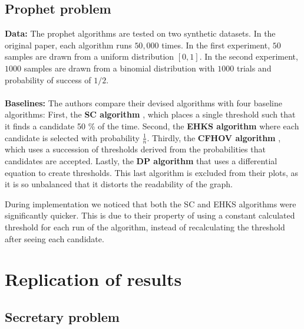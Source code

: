 \subsection{Prophet problem}
\textbf{Data:}
The prophet algorithms are tested on two synthetic datasets. In the original paper, each algorithm runs $50,000$ times. In the first experiment, $50$ samples are drawn from a uniform distribution $[0,1]$. In the second experiment, $1000$ samples are drawn from a binomial distribution with $1000$ trials and probability of success of $1/2$.
\\ \\
\textbf{Baselines:}
The authors compare their devised algorithms with four baseline algorithms: First, the \textbf{SC algorithm} \citet{SamualCahn1984}, which places a single threshold such that it finds a candidate 50 \% of the time. Second, the \textbf{EHKS algorithm }\citet{Ehsani2017} where each candidate is selected with probability $\frac{1}{n}$. Thirdly,  the \textbf{CFHOV algorithm} \citet{correa21b}, which uses a succession of thresholds derived from the probabilities that  candidates are accepted.
Lastly, the \textbf{DP algorithm} \citet{Chow1971} that uses a differential equation to create thresholds. This last algorithm is excluded from their plots, as it is so unbalanced that it distorts the readability of the graph.

During implementation we noticed that both the SC and EHKS algorithms were significantly quicker. This is due to their property of using a constant calculated threshold for each run of the algorithm, instead of recalculating the threshold after seeing each candidate.

\section{Replication of results}

\subsection{Secretary problem}

